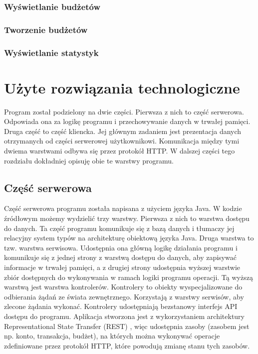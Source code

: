 \documentclass[shortabstract,inz]{iithesis}
\begin{document}
\subsection{Wyświetlanie budżetów}
\subsection{Tworzenie budżetów}
\subsection{Wyświetlanie statystyk}


\chapter{Użyte rozwiązania technologiczne}
Program został podzielony na dwie części. Pierwsza z nich to część serwerowa. Odpowiada ona za logikę programu i przechowywanie danych w trwałej pamięci. Druga część to część kliencka. Jej głównym zadaniem jest prezentacja danych otrzymanych od części serwerowej użytkownikowi. Komunikacja między tymi dwiema warstwami odbywa się przez protokół HTTP. W dalszej części tego rozdziału dokładniej opisuję obie te warstwy programu.
\section{Część serwerowa}
Część serwerowa programu została napisana z użyciem języka Java. W kodzie źródłowym możemy wydzielić trzy warstwy. Pierwsza z nich to warstwa dostępu do danych. Ta część programu komunikuje się z bazą danych i tłumaczy jej relacyjny system typów na architekturę obiektową języka Java. Druga warstwa to tzw. warstwa serwisowa. Udostępnia ona główną logikę działania programu i komunikuje się z jednej strony z warstwą dostępu do danych, aby zapisywać informacje w trwałej pamięci, a z drugiej strony udostępnia wyższej warstwie zbiór dostępnych do wykonywania w ramach logiki programu operacji. Tą wyższą warstwą jest warstwa kontrolerów. Kontrolery to obiekty wyspecjalizowane do odbierania żądań ze świata zewnętrznego. Korzystają z warstwy serwisów, aby zlecone żądania wykonać.
Kontrolery udostępniają bezstanowy interfejs API dostępu do programu. Aplikacja stworzona jest z wykorzystaniem architektury Representational State Transfer (REST) \cite{rest} , więc udostępnia zasoby (zasobem jest np. konto, transakcja, budżet), na których można wykonywać operacje zdefiniowane przez protokół HTTP, które powodują zmianę stanu tych zasobów.
\end{document}
